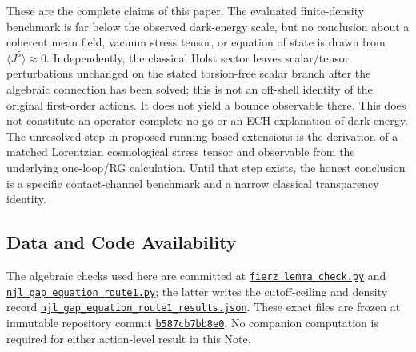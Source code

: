 \documentclass[aps,prd,twocolumn,superscriptaddress,preprintnumbers,nofootinbib,longbibliography,floatfix]{revtex4-2}
\newcommand{\artifactpinned}[2]{\href{https://github.com/Hubify-Projects/bigbounce/blob/b587cb7bb8e075aa9d0245ba8257fcef7ff196b8/#1}{\nolinkurl{#2}}}
\begin{document}
These are the complete claims of this paper.  The evaluated finite-density
benchmark is far below the observed dark-energy scale, but no conclusion about
a coherent mean field, vacuum stress tensor, or equation of state is drawn
from $\langle J^5\rangle\approx0$.  Independently, the classical Holst sector
leaves scalar/tensor perturbations unchanged on the stated torsion-free scalar
branch after the algebraic connection has been solved; this is not an off-shell
identity of the original first-order actions.  It does not yield a bounce
observable there.  This does not constitute
an operator-complete no-go or an ECH explanation of dark energy.  The unresolved
step in proposed running-based extensions is the derivation of a matched
Lorentzian cosmological stress tensor and observable from the underlying
one-loop/RG calculation.  Until that step exists, the honest conclusion is a
specific contact-channel benchmark and a narrow classical transparency
identity.

\subsection*{Data and Code Availability}

The algebraic checks used here are committed at
\artifactpinned{arxiv/scripts/fierz_lemma_check.py}{fierz_lemma_check.py} and
\artifactpinned{arxiv/scripts/njl_gap_equation_route1.py}{njl_gap_equation_route1.py}; the latter writes the
cutoff-ceiling and density record
\artifactpinned{arxiv/scripts/njl_gap_equation_route1_results.json}{njl_gap_equation_route1_results.json}.  These exact files are frozen at immutable
repository commit
\href{https://github.com/Hubify-Projects/bigbounce/tree/b587cb7bb8e075aa9d0245ba8257fcef7ff196b8}{\texttt{b587cb7bb8e0}}.
No companion computation is
required for either action-level result in this Note.

\appendix
\end{document}
